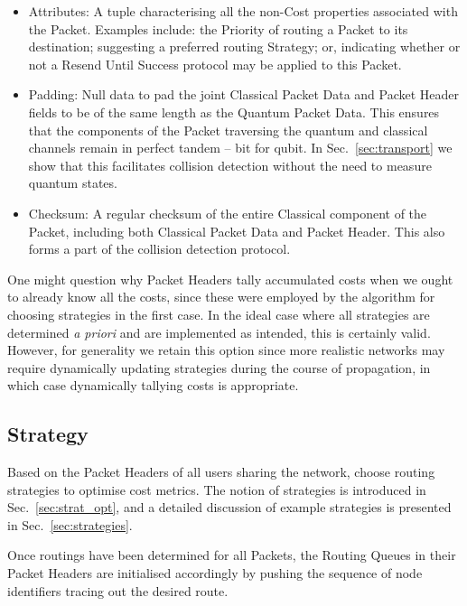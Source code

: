 \documentclass[aps,rmp,twocolumn,amsmath,amssymb,nofootinbib,superscriptaddress,longbibliography,floatfix]{revtex4-1}
\begin{document}
\begin{itemize}
    \item {\sc Attributes}: A tuple characterising all the non-{\sc Cost} properties associated with the {\sc Packet}. Examples include: the {\sc Priority} of routing a {\sc Packet} to its destination; suggesting a preferred routing {\sc Strategy}; or, indicating whether or not a {\sc Resend Until Success} protocol may be applied to this {\sc Packet}.
    \item {\sc Padding}: Null data to pad the joint {\sc Classical Packet Data} and {\sc Packet Header} fields to be of the same length as the {\sc Quantum Packet Data}. This ensures that the components of the {\sc Packet} traversing the quantum and classical channels remain in perfect tandem -- bit for qubit. In Sec.~\ref{sec:transport} we show that this facilitates collision detection without the need to measure quantum states.
    \item {\sc Checksum}: A regular checksum of the entire {\sc Classical} component of the {\sc Packet}, including both {\sc Classical Packet Data} and {\sc Packet Header}. This also forms a part of the collision detection protocol.
\end{itemize}

One might question why {\sc Packet Headers} tally accumulated costs when we ought to already know all the costs, since these were employed by the algorithm for choosing strategies in the first case. In the ideal case where all strategies are determined \emph{a priori} and are implemented as intended, this is certainly valid. However, for generality we retain this option since more realistic networks may require dynamically updating strategies during the course of propagation, in which case dynamically tallying costs is appropriate.

%
%

\subsection{Strategy} \label{sec:into_strat}

Based on the {\sc Packet Headers} of all users sharing the network, choose routing strategies to optimise cost metrics. The notion of strategies is introduced in Sec.~\ref{sec:strat_opt}, and a detailed discussion of example strategies is presented in Sec.~\ref{sec:strategies}.

Once routings have been determined for all {\sc Packets}, the {\sc Routing Queues} in their {\sc Packet Headers} are initialised accordingly by pushing the sequence of node identifiers tracing out the desired route.
\end{document}
